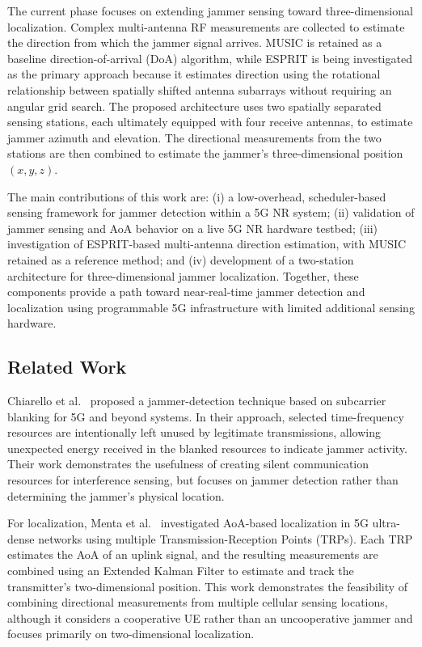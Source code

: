 \documentclass[conference]{IEEEtran}
\begin{document}
The current phase focuses on extending jammer sensing toward three-dimensional localization. Complex multi-antenna RF measurements are collected to estimate the direction from which the jammer signal arrives. MUSIC is retained as a baseline direction-of-arrival (DoA) algorithm, while ESPRIT is being investigated as the primary approach because it estimates direction using the rotational relationship between spatially shifted antenna subarrays without requiring an angular grid search. The proposed architecture uses two spatially separated sensing stations, each ultimately equipped with four receive antennas, to estimate jammer azimuth and elevation. The directional measurements from the two stations are then combined to estimate the jammer's three-dimensional position $(x,y,z)$.

The main contributions of this work are: (i) a low-overhead, scheduler-based sensing framework for jammer detection within a 5G NR system; (ii) validation of jammer sensing and AoA behavior on a live 5G NR hardware testbed; (iii) investigation of ESPRIT-based multi-antenna direction estimation, with MUSIC retained as a reference method; and (iv) development of a two-station architecture for three-dimensional jammer localization. Together, these components provide a path toward near-real-time jammer detection and localization using programmable 5G infrastructure with limited additional sensing hardware.


\subsection*{Related Work}
Chiarello et al.~\cite{9569600} proposed a jammer-detection technique based on
subcarrier blanking for 5G and beyond systems. In their approach, selected
time-frequency resources are intentionally left unused by legitimate
transmissions, allowing unexpected energy received in the blanked resources to
indicate jammer activity. Their work demonstrates the usefulness of creating
silent communication resources for interference sensing, but focuses on jammer
detection rather than determining the jammer's physical location.

For localization, Menta et al.~\cite{article1} investigated AoA-based
localization in 5G ultra-dense networks using multiple Transmission-Reception
Points (TRPs). Each TRP estimates the AoA of an uplink signal, and the resulting
measurements are combined using an Extended Kalman Filter to estimate and track
the transmitter's two-dimensional position. This work demonstrates the
feasibility of combining directional measurements from multiple cellular
sensing locations, although it considers a cooperative UE rather than an
uncooperative jammer and focuses primarily on two-dimensional localization.
\end{document}
